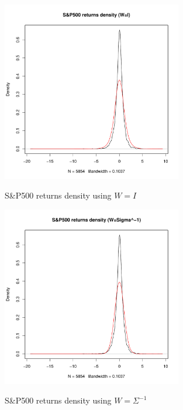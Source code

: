 \begin{figure}
    \centering
    \includegraphics[width=0.7\textwidth]{S&P500_returns_density_(W=I).pdf}
    \label{SP500_returns_density_I}
    \caption{S\&P500 returns density using $W=I$}
    \includegraphics[width=0.7\textwidth]{S&P500_returns_density_(W=Sigma^-1).pdf}
    \label{SP500_returns_density_W}
    \caption{S\&P500 returns density using $W=\Sigma^{-1}$}
\end{figure}